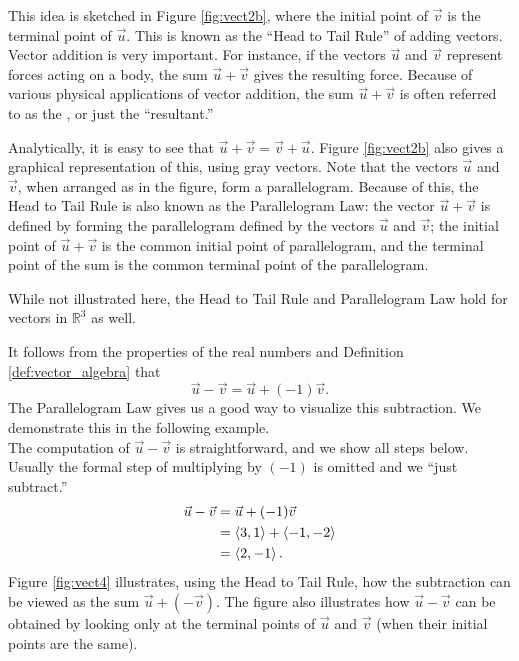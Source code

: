 This idea is sketched in Figure \ref{fig:vect2b}, where the initial point of $\vec v$ is the terminal point of $\vec u$. This is known as the ``Head to Tail Rule'' of adding vectors. Vector addition is very important. For instance, if the vectors $\vec u$ and $\vec v$ represent forces acting on a body, the sum $\vec u+\vec v$ gives the resulting force. Because of various physical applications of vector addition, the sum $\vec u+\vec v$ is often referred to as the , or just the ``resultant.''

Analytically, it is easy to see that $\vec u+\vec v = \vec v+\vec u$. Figure \ref{fig:vect2b} also gives a graphical representation of this, using gray vectors. Note that the vectors $\vec u$ and $\vec v$, when arranged as in the figure, form a parallelogram. Because of this, the Head to Tail Rule is also known as the Parallelogram Law: the vector $\vec u+\vec v$ is defined by forming the parallelogram defined by the vectors $\vec u$ and $\vec v$; the initial point of $\vec u+\vec v$ is the common initial point of parallelogram, and the terminal point of the sum is the common terminal point of the parallelogram.

While not illustrated here, the Head to Tail Rule and Parallelogram Law hold for vectors in $\mathbb{R}^3$ as well.

It follows from the properties of the real numbers and Definition \ref{def:vector_algebra} that $$\vec u-\vec v = \vec u + (-1)\vec v.$$ The Parallelogram Law gives us a good way to visualize this subtraction. We demonstrate this in the following example.\\

{The computation of $\vec u-\vec v$ is straightforward, and we show all steps below. Usually the formal step of multiplying by $(-1)$ is omitted and we ``just subtract.''
\begin{align*}
\vec u-\vec v &= \vec u + (-1)\vec v \\
							&= \left\langle 3,1\right\rangle + \left\langle -1,-2\right\rangle\\
							&= \left\langle 2,-1\right\rangle.
\end{align*}
Figure \ref{fig:vect4} illustrates, using the Head to Tail Rule, how the subtraction can be viewed as the  sum $\vec u + (-\vec v)$. The figure also illustrates how $\vec u-\vec v$ can be obtained by looking only at the terminal points of $\vec u$ and $\vec v$ (when their initial points are the same).
}\\

